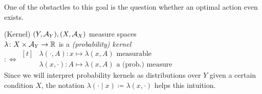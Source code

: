 One of the obstactles to this goal is the question whether an optimal action even exists.
\begin{definition}(Kernel)
	\((Y,\mathcal{A}_Y), (X,\mathcal{A}_X)\) measure spaces\\
	 \(\lambda\colon X\times\mathcal{A}_Y\to \mathbb{R}\) is a \emph{(probability) kernel} \(
	 :\iff \begin{aligned}[t]
	 &\lambda(\cdot,A)\colon x\mapsto \lambda(x,A) \text{ measurable}\\
	 &\lambda(x,\cdot)\colon A\mapsto \lambda(x,A) \text{ a (prob.) measure}
	 \end{aligned}
	  \)\\
	  Since we will interpret probability kernels as distributions over \(Y\) given a  certain condition \(X\), the notation \(\lambda(\cdot\mid x) \coloneqq \lambda(x,\cdot)\) helps this intuition. 
\end{definition}
